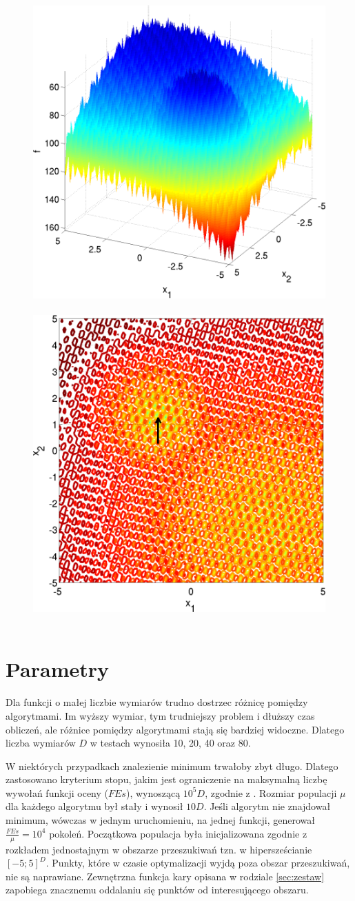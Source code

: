 \documentclass[a4paper,onecolumn,oneside,11pt,wide,floatssmall]{mwrep}
\theoremstyle{definition}
\theoremstyle{plain}%
\theoremstyle{remark}
\begin{document}
\begin{figure}[H]
\centering
\mbox{
\includegraphics[width=.45\textwidth]{img/24.png} \quad
\includegraphics[width=.45\textwidth]{img/24a.png} 
}
\end{figure}

\section{Parametry}

Dla funkcji o małej liczbie wymiarów trudno dostrzec różnicę pomiędzy algorytmami. Im wyższy wymiar,
tym trudniejszy problem i dłuższy czas obliczeń, ale różnice pomiędzy algorytmami stają się bardziej 
widoczne. Dlatego liczba wymiarów $D$ w testach wynosiła 10, 20, 40 oraz 80. 

W niektórych przypadkach znalezienie minimum trwałoby zbyt długo. Dlatego zastosowano kryterium stopu,
jakim jest ograniczenie na maksymalną liczbę wywołań funkcji oceny ($FEs$), wynoszącą $10^5D$, 
zgodnie z \cite{setup}. Rozmiar populacji $\mu$ dla każdego algorytmu był stały i wynosił $10D$. 
Jeśli algorytm nie znajdował 
minimum, wówczas w jednym uruchomieniu, na jednej funkcji, generował $\frac{FEs}{\mu} = 10^4$ pokoleń.
Początkowa populacja była inicjalizowana zgodnie z rozkładem jednostajnym w obszarze przeszukiwań tzn.
w hipersześcianie $[-5; 5]^D$. Punkty, które w czasie optymalizacji wyjdą poza obszar
przeszukiwań, nie są naprawiane. Zewnętrzna funkcja kary opisana w rodziale \ref{sec:zestaw}
zapobiega znacznemu oddalaniu się punktów od interesującego obszaru.
\end{document}

